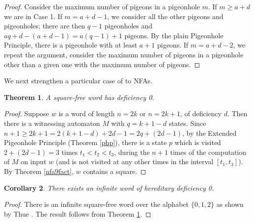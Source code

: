 \documentclass[12pt]{article}
\newcommand{\squarefree}{square-free}
\theoremstyle{plain}
\newtheorem{thm}{Theorem}
\newtheorem{cor}[thm]{Corollary}
\theoremstyle{definition}
\theoremstyle{remark}
\begin{document}
			\begin{proof}
				Consider the maximum number of pigeons in a pigeonhole $m$. If $m\ge a+d$ we are in Case 1.
				If $m=a+d-1$, we consider all the other pigeons and pigeonholes;
				there are then $q-1$ pigeonholes and $aq+d-(a+d-1)=a(q-1)+1$ pigeons.
				By the plain Pigeonhole Principle, there is a pigeonhole with at least $a+1$ pigeons.
				If $m=a+d-2$, we repeat the argument,
				consider the maximum number of pigeons in a pigeonhole other than a given one with the maximum number
				of pigeons.
			\end{proof}
			We next strengthen a particular case of \cite[Theorem 9]{MR1897300} to NFAs.
			\begin{thm}\label{nfa9square}
				A {\squarefree} word has deficiency 0.
			\end{thm}
			\begin{proof}
				Suppose $w$ is a word of length $n=2k$ or $n=2k+1$, of deficiency $d$.
				Then there is a witnessing automaton $M$ with $q = k + 1 - d$ states.
				Since $n + 1\ge 2k+ 1 = 2(k + 1 - d) + 2d - 1 = 2q + (2d-1)$, by the Extended Pigeonhole Principle (Theorem \ref{php}),
				there is a state $p$ which is visited $2+(2d-1)=3$ times $t_1 < t_2 < t_3$, during the $n + 1$ times of the computation of $M$
				on input $w$ (and is not visited at any other times in the interval $[t_1,t_3]$).
				By Theorem \ref{nfa9fact}, $w$ contains a square.
			\end{proof}
			\begin{cor}
				There exists an infinite word of hereditary deficiency 0.
			\end{cor}
			\begin{proof}
				There is an infinite {\squarefree} word over the alphabet $\{0,1,2\}$ as shown by Thue \cite{ThueTwo}.
				The result follows from Theorem \ref{nfa9square}.
			\end{proof}
\end{document}
